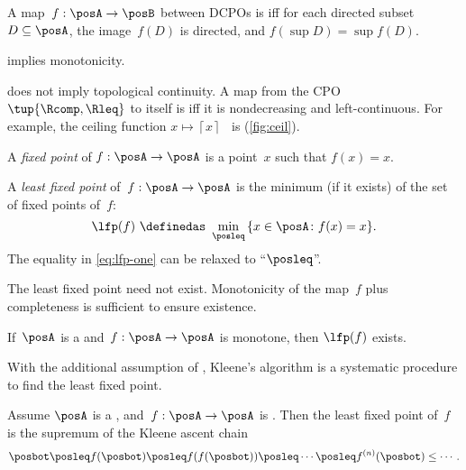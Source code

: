 \begin{definition}[\scottcontinuity]
  \label{def:scott}A map~$f:\posA\rightarrow\posB$ between DCPOs
  is\textbf{ }\emph{\scottcontinuous{}}\textbf{ }iff for each directed
  subset~$D\subseteq\posA$, the image~$f(D)$ is directed, and $f(\sup D)=\sup f(D).$
\end{definition}
\begin{remark}
  \scottcontinuity implies monotonicity.
\end{remark}

\begin{remark}
  \scottcontinuity does not imply topological continuity. A map from
  the CPO $\tup{\Rcomp,\Rleq}$ to itself is \scottcontinuous
  iff it is nondecreasing and left-continuous. For example, the ceiling
  function $x\mapsto\left\lceil x\right\rceil $~ is \scottcontinuous
  (\cref{fig:ceil}).
\end{remark}

\emph{}

A \emph{fixed point} of $f:\posA\to\posA$ is a point~$x$
such that $f(x)=x$.
\begin{definition}\label{def:least-fixed}
  A \emph{least fixed point} of~$f:\posA\to\posA$ is the minimum
  (if it exists) of the set of fixed points of~$f$:
  \begin{equation}
    \label{eq:lfp-one}
    \lfp(f)\,\,\definedas\,\,\min_{\posleq}\,\{x\in\posA\colon f(x)=x\}.
  \end{equation}
  The equality in \cref{eq:lfp-one} can be relaxed to ``$\posleq$''.
\end{definition}
The least fixed point need not exist. Monotonicity of the map~$f$
plus completeness is sufficient to ensure existence.
\begin{lemma}
  \label{lem:CPO-fix-point-2}If~$\posA$ is a \CPO and~$f:\posA\rightarrow\posA$
  is monotone, then $\lfp(f)$ exists.
\end{lemma}


With the additional assumption of \scottcontinuity, Kleene's algorithm
is a systematic procedure to find the least fixed point.
\begin{lemma}
  \label{lem:kleene-1}Assume $\posA$ is a \CPO, and~$f:\posA\rightarrow\posA$
  is \scottcontinuous. Then the least fixed point of~$f$ is the supremum
  of the Kleene ascent chain
  \[
    \posbot\posleq f(\posbot)\posleq f(f(\posbot))\posleq\cdots\posleq f^{(n)}(\posbot)\leq\cdots.
  \]
\end{lemma}
